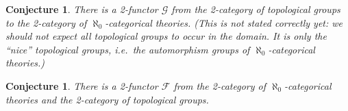 \documentclass[12pt]{article}
\newtheorem{conj}[prop]{Conjecture}
\theoremstyle{definition}
\theoremstyle{remark}
\newcommand{\3}{\mathcal}
\begin{document}
\begin{conj} There is a 2-functor $\3G$ from the 2-category of
  topological groups to the 2-category of $\aleph _0$-categorical
  theories. (This is not stated correctly yet: we should not expect
  all topological groups to occur in the domain. It is only the
  ``nice'' topological groups, i.e.\ the automorphism groups of
  $\aleph _0$-categorical theories.) \end{conj}


\begin{conj} There is a 2-functor $\3F$ from the 2-category of
  $\aleph _0$-categorical theories and the 2-category of topological
  groups. \end{conj}







\printbibliography 
\end{document}
